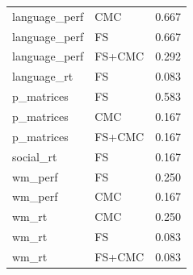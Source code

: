 \documentclass{article}
\begin{document}
\begin{longtable}{llr}
	language\_perf & CMC & 0.667 \\
	language\_perf & FS & 0.667 \\
	\vspace{0.2cm}
	language\_perf & FS+CMC & 0.292 \\
	\vspace{0.2cm}
	language\_rt & FS & 0.083 \\
	p\_matrices & FS & 0.583 \\
	p\_matrices & CMC & 0.167 \\
	\vspace{0.2cm}
	p\_matrices & FS+CMC & 0.167 \\
	\vspace{0.2cm}
	social\_rt & FS & 0.167 \\
	wm\_perf & FS & 0.250 \\
	\vspace{0.2cm}
	wm\_perf & CMC & 0.167 \\
	wm\_rt & CMC & 0.250 \\
	wm\_rt & FS & 0.083 \\
	wm\_rt & FS+CMC & 0.083 \\
	\end{longtable}
\end{document}
